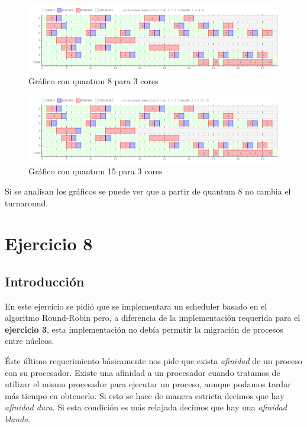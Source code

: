\documentclass[a4paper,11pt]{article}
\begin{document}
\begin{figure}[H]
\centering
\includegraphics[scale=.6, width=1\textwidth]{graficos/ej7-3core-q3}
\caption{Gráfico con quantum 8 para 3 cores}
\end{figure}

\begin{figure}[H]
\centering
\includegraphics[scale=.6, width=1\textwidth]{graficos/ej7-3core-q4}
\caption{Gráfico con quantum 15 para 3 cores}
\end{figure}

Si se analisan los gráficos se puede ver que a partir de quantum 8 no cambia el turnaround.

\pagebreak

\section{Ejercicio 8}
	\subsection{Introducci\'on}
		En este ejercicio se pidió que se implementara un scheduler basado en el algoritmo Round-Robin pero, a diferencia de la implementación requerida para el \textbf{ejercicio 3}, esta implementación no debía permitir la migración de procesos entre núcleos.
		
		Éste último requerimiento básicamente nos pide que exista \emph{afinidad} de un proceso con su procesador.
		Existe una afinidad a un procesador cuando tratamos de utilizar el mismo procesador para ejecutar un proceso, aunque podamos tardar más tiempo en obtenerlo. Si esto se hace de manera estricta decimos que hay \emph{afinidad dura}. Si esta condición es más relajada decimos que hay una \emph{afinidad blanda}.
		
\end{document}
